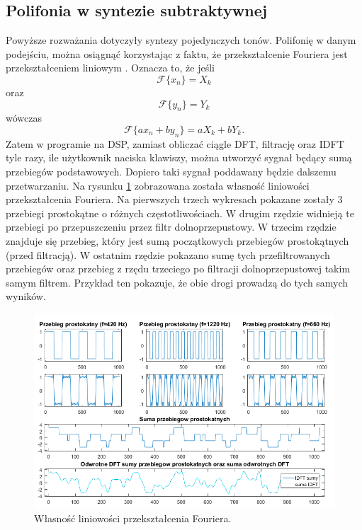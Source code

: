 \subsection{Polifonia w syntezie subtraktywnej}
Powyższe rozważania dotyczyły syntezy pojedynczych tonów. Polifonię w danym podejściu, można osiągnąć korzystając z faktu, że przekształcenie Fouriera jest przekształceniem liniowym \cite{schafer}. Oznacza to, że jeśli
 \begin{equation} \label{equ:sub_5}
 \mathcal{F}\{x_n\} = X_k
 \end{equation}
 oraz 
  \begin{equation} \label{equ:sub_6}
 \mathcal{F}\{y_n\} = Y_k
 \end{equation}
 wówczas
  \begin{equation} \label{equ:sub_7}
\mathcal{F}\{ax_n + by_n\} = aX_k + bY_k.
\end{equation} 
Zatem w programie na DSP, zamiast obliczać ciągle DFT, filtrację oraz IDFT tyle razy, ile użytkownik naciska klawiszy, można utworzyć sygnał będący sumą przebiegów podstawowych. Dopiero taki sygnał poddawany będzie dalszemu przetwarzaniu. Na rysunku \ref{rys:sub_linearity}	zobrazowana została własność liniowości przekształcenia Fouriera. Na pierwszych trzech wykresach pokazane zostały 3 przebiegi prostokątne o różnych częstotliwościach. W drugim rzędzie widnieją te przebiegi po przepuszczeniu przez filtr dolnoprzepustowy. W trzecim rzędzie znajduje się przebieg, który jest sumą początkowych przebiegów prostokątnych (przed filtracją). W ostatnim rzędzie pokazano sumę tych przefiltrowanych przebiegów oraz przebieg z rzędu trzeciego po filtracji dolnoprzepustowej takim samym filtrem. Przykład ten pokazuje, że obie drogi prowadzą do tych samych wyników.
\begin{figure}[H]
	\centering
	\includegraphics[width=16cm]{grafiki/sub_linearity}
	\captionsetup{justification=centering}
	\caption{Własność liniowości przekształcenia Fouriera.}
	\label{rys:sub_linearity}
\end{figure}

